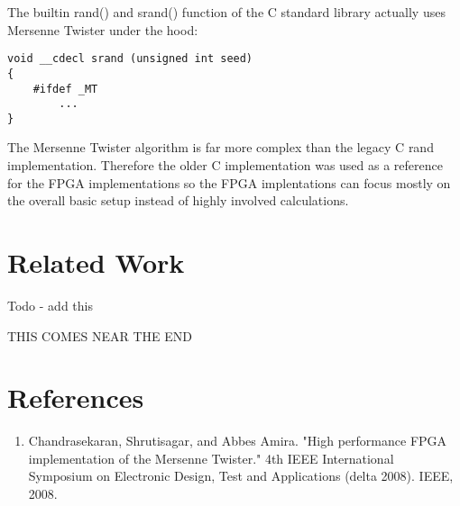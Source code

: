 \documentclass{article}
\begin{document}
\begin{multicols}{2}
    The builtin rand() and srand() function of the C
    standard library actually uses Mersenne Twister under the
    hood:

    \begin{lstlisting}
void __cdecl srand (unsigned int seed)
{
    #ifdef _MT
        ...
}
    \end{lstlisting}

    The Mersenne Twister algorithm is far more complex
    than the legacy C rand implementation. Therefore the older
    C implementation was used as a reference for the FPGA
    implementations so the FPGA implentations can focus
    mostly on the overall basic setup instead of
    highly involved calculations.
    
    \section{Related Work}

    Todo - add this

    THIS COMES NEAR THE END

    
    \end{multicols}

    \break
    \section*{References}

    \begin{enumerate}

    \item Chandrasekaran, Shrutisagar, and Abbes Amira. "High performance FPGA implementation of the Mersenne Twister." 4th IEEE International Symposium on Electronic Design, Test and Applications (delta 2008). IEEE, 2008.

    \end{enumerate}
    
\end{document}
